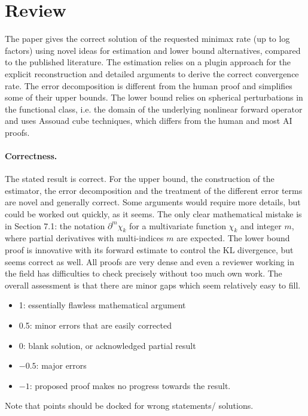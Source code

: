 \documentclass[11pt]{article}
\theoremstyle{definition}
\theoremstyle{remark}
\begin{document}
\maketitle

\section{Review}

The paper gives the correct solution of the requested minimax rate (up to log factors) using novel ideas for estimation and lower bound alternatives, compared to the published literature. The estimation relies on a plugin approach for the explicit reconstruction and detailed arguments to derive the correct convergence rate. The error decomposition is different from the human proof and simplifies some of their upper bounds. The lower bound relies on spherical perturbations in the functional class, i.e. the domain of the underlying nonlinear forward operator and uses Assouad cube techniques, which differs from the human and most AI proofs. 

\paragraph{Correctness.}

The stated result is correct. For the upper bound, the construction of the estimator, the error decomposition and the treatment of the different error terms are novel and generally correct. Some arguments would require more details, but could be worked out quickly, as it seems. The only clear mathematical mistake is in Section 7.1: the notation $\partial^m\chi_k$ for a multivariate function $\chi_k$ and integer $m$, where partial derivatives with multi-indices $m$ are expected. The lower bound proof is innovative with its forward estimate to control the KL divergence, but seems correct as well. All proofs are very dense and even a reviewer working in the field has difficulties to check precisely without too much own work. The overall assessment is that there are minor gaps which seem relatively easy to fill.

\begin{itemize}
	\item  1: essentially flawless mathematical argument
	\item  0.5: minor errors that are easily corrected
	\item  0: blank solution, or acknowledged partial result
	\item  $-0.5$: major errors
	\item  $-1$: proposed proof makes no progress towards the result.
\end{itemize}
Note that points should be docked for wrong statements/ solutions.
\end{document}
